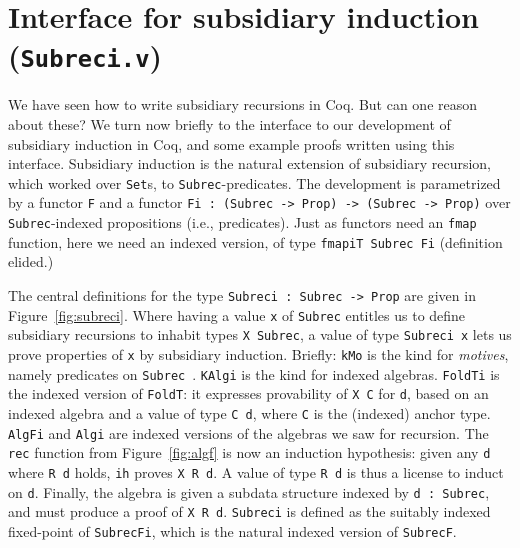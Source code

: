\documentclass[a4paper,USenglish]{lipics-v2021}
\begin{document}
\section{Interface for subsidiary induction (\texttt{Subreci.v})}
\label{sec:interfacei}

We have seen how to write subsidiary recursions in Coq.  But can one
reason about these?  We turn now briefly to the
interface to our development of subsidiary induction in Coq, and
some example proofs written using this interface.  Subsidiary induction is
the natural extension of subsidiary recursion, which worked over
\verb|Set|s, to \verb|Subrec|-predicates.  The development is
parametrized by a functor \verb|F| and a functor
\verb|Fi : (Subrec -> Prop) -> (Subrec -> Prop)| over
\verb|Subrec|-indexed propositions (i.e., predicates).  Just as
functors need an \verb|fmap| function, here we need an indexed
version, of type \verb|fmapiT Subrec Fi| (definition elided.)

The central definitions for the type \verb|Subreci : Subrec -> Prop|
are given in Figure~\ref{fig:subreci}.  Where having a value \verb|x|
of \verb|Subrec| entitles us to define subsidiary recursions to
inhabit types \verb|X Subrec|, a value of type \verb|Subreci x| lets
us prove properties of \verb|x| by subsidiary induction.  Briefly:
\verb|kMo| is the kind for \emph{motives}, namely predicates on
\verb|Subrec|~\cite{mcbride00}.  \verb|KAlgi| is the kind for indexed
algebras.  \verb|FoldTi| is the indexed version of \verb|FoldT|: it 
expresses provability of \verb|X C| for \verb|d|, based on an indexed
algebra and a value of type \verb|C d|, where \verb|C| is the (indexed) anchor
type.  \verb|AlgFi| and \verb|Algi| are indexed versions
of the algebras we saw for recursion.  The \verb|rec| function
from Figure~\ref{fig:algf} is now an induction hypothesis: given
any \verb|d| where \verb|R d| holds, \verb|ih| proves \verb|X R d|.  A
value of type \verb|R d| is thus a license to induct on \verb|d|.
Finally, the algebra is given a subdata structure indexed by
\verb|d : Subrec|, and must produce a proof of \verb|X R d|.  \verb|Subreci|
is defined as the suitably indexed fixed-point of \verb|SubrecFi|, which
is the natural indexed version of \verb|SubrecF|.
\end{document}
